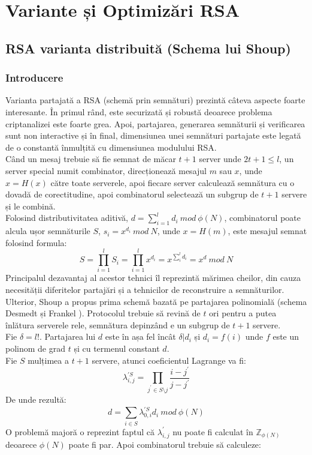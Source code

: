 \documentclass[12]{report}
\begin{document}
\chapter{Variante și Optimizări RSA}
\section{RSA varianta distribuită (Schema lui Shoup)}
\subsection{Introducere}
Varianta partajată a RSA (schemă prin semnături) prezintă câteva aspecte foarte interesante. În primul rând, este securizată și robustă deoarece problema criptanalizei este foarte grea. Apoi, partajarea, generarea semnăturii și verificarea sunt non interactive și în final, dimensiunea unei semnături partajate este legată de o constantă înmulțită cu dimensiunea modulului RSA. \\
Când un mesaj trebuie să fie semnat de măcar $ t+1 $ server unde $ 2t+1 \leqslant l $, un server special numit combinator, direcționează mesajul $m$ sau $x$, unde $x=H(x)$ către toate serverele, apoi fiecare server calculează semnătura cu o dovadă de corectitudine, apoi combinatorul selectează un subgrup de $t+1$ servere și le combină. \\
Folosind distributivitatea aditivă, $d=\sum_{i=1}^{l} d_i \ mod \ \phi(N)$, combinatorul poate alcula ușor semnăturile $S$, $s_i=x^{d_i} \ mod \ N$, unde $x=H(m)$, este mesajul semnat folosind formula:
$$ S= \prod_{i=1}^{l} S_i = \prod_{i=1}^{l} x^{d_i} = x^{\sum_{i}^{l} d_i} = x^d \ mod \ N $$
Principalul dezavantaj al acestor tehnici îl reprezintă mărimea cheilor, din cauza necesității diferitelor partajări și a tehnicilor de reconstruire a semnăturilor. Ulterior, Shoup a propus prima schemă bazată pe partajarea polinomială (schema Desmedt și Frankel \cite{desmet}). Protocolul trebuie să revină de $t$ ori pentru a putea înlătura serverele rele, semnătura depinzând e un subgrup de $t+1$ servere. \\
Fie $\delta =l!$. Partajarea lui $d$ este în așa fel încât $\delta | d_i$ și $d_i =f(i)$ unde $f$ este un polinom de grad $t$ și cu termenul constant $d$. \\
Fie $S$ mulțimea a $t+1$ servere, atunci coeficientul Lagrange va fi: 
$$ \lambda_{i,j}^{'S} = \prod_{j^{'} \in S \setminus j}^{} \frac{i-j^{'}}{j-j^{'}}   $$
De unde rezultă:
$$ d= \sum_{i \in S}^{} \lambda_{0,i}^{'S} d_i \ mod \ \phi(N)$$
O problemă majoră o reprezint faptul că $\lambda_{i,j}^{'}$ nu poate fi calculat în $\mathbb{Z}_{\phi(N)}$ deoarece $\phi(N)$ poate fi par. Apoi combinatorul trebuie să calculeze:
\end{document}
